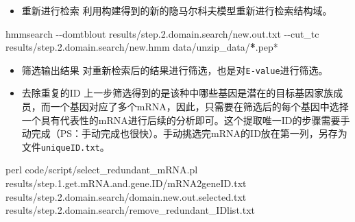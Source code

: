 \documentclass[
  10pt,
]{book}
\newenvironment{Shaded}{\begin{snugshade}}{\end{snugshade}}
\newcommand{\ErrorTok}[1]{\textcolor[rgb]{0.64,0.00,0.00}{\textbf{#1}}}
\newcommand{\FloatTok}[1]{\textcolor[rgb]{0.00,0.00,0.81}{#1}}
\newcommand{\NormalTok}[1]{#1}
\newcommand{\SpecialCharTok}[1]{\textcolor[rgb]{0.00,0.00,0.00}{#1}}
\newcommand{\StringTok}[1]{\textcolor[rgb]{0.31,0.60,0.02}{#1}}
\providecommand{\tightlist}{%
  \setlength{\itemsep}{0pt}\setlength{\parskip}{0pt}}
\begin{document}
\begin{itemize}
\tightlist
\item
  重新进行检索
  利用构建得到的新的隐马尔科夫模型重新进行检索结构域。
\end{itemize}

\begin{Shaded}
\begin{Highlighting}[]
\NormalTok{hmmsearch }\SpecialCharTok{{-}{-}}\NormalTok{domtblout results}\SpecialCharTok{/}\NormalTok{step.}\FloatTok{2.}\NormalTok{domain.search}\SpecialCharTok{/}\NormalTok{new.out.txt }\SpecialCharTok{{-}{-}}\NormalTok{cut\_tc results}\SpecialCharTok{/}\NormalTok{step.}\FloatTok{2.}\NormalTok{domain.search}\SpecialCharTok{/}\NormalTok{new.hmm data}\SpecialCharTok{/}\NormalTok{unzip\_data}\SpecialCharTok{/}\ErrorTok{*}\NormalTok{.pep}\SpecialCharTok{*}
\end{Highlighting}
\end{Shaded}

\begin{itemize}
\tightlist
\item
  筛选输出结果
  对重新检索后的结果进行筛选，也是对\texttt{E-value}进行筛选。
\end{itemize}

\begin{Shaded}
\end{Shaded}

\begin{itemize}
\tightlist
\item
  去除重复的ID
  上一步筛选得到的是该种中哪些基因是潜在的目标基因家族成员，而一个基因对应了多个mRNA，因此，只需要在筛选后的每个基因中选择一个具有代表性的mRNA进行后续的分析即可。这个提取唯一ID的步骤需要手动完成（PS：手动完成也很快）。手动挑选完mRNA的ID放在第一列，另存为文件\texttt{uniqueID.txt}。
\end{itemize}

\begin{Shaded}
\begin{Highlighting}[]
\NormalTok{perl code}\SpecialCharTok{/}\NormalTok{script}\SpecialCharTok{/}\NormalTok{select\_redundant\_mRNA.pl results}\SpecialCharTok{/}\NormalTok{step.}\FloatTok{1.}\NormalTok{get.mRNA.and.gene.ID}\SpecialCharTok{/}\NormalTok{mRNA2geneID.txt results}\SpecialCharTok{/}\NormalTok{step.}\FloatTok{2.}\NormalTok{domain.search}\SpecialCharTok{/}\NormalTok{domain.new.out.selected.txt results}\SpecialCharTok{/}\NormalTok{step.}\FloatTok{2.}\NormalTok{domain.search}\SpecialCharTok{/}\NormalTok{remove\_redundant\_IDlist.txt}
\end{Highlighting}
\end{Shaded}
\end{document}

